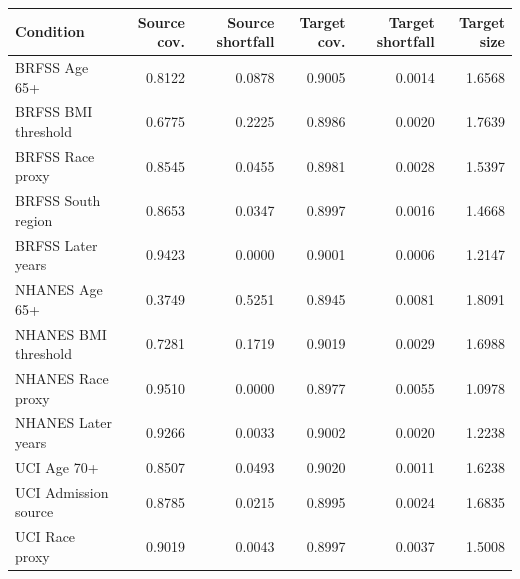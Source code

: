 \begin{tabular}{lrrrrr}
\toprule
Condition & Source cov. & Source shortfall & Target cov. & Target shortfall & Target size \\
\midrule
BRFSS Age 65+ & 0.8122 & 0.0878 & 0.9005 & 0.0014 & 1.6568 \\
BRFSS BMI threshold & 0.6775 & 0.2225 & 0.8986 & 0.0020 & 1.7639 \\
BRFSS Race proxy & 0.8545 & 0.0455 & 0.8981 & 0.0028 & 1.5397 \\
BRFSS South region & 0.8653 & 0.0347 & 0.8997 & 0.0016 & 1.4668 \\
BRFSS Later years & 0.9423 & 0.0000 & 0.9001 & 0.0006 & 1.2147 \\
NHANES Age 65+ & 0.3749 & 0.5251 & 0.8945 & 0.0081 & 1.8091 \\
NHANES BMI threshold & 0.7281 & 0.1719 & 0.9019 & 0.0029 & 1.6988 \\
NHANES Race proxy & 0.9510 & 0.0000 & 0.8977 & 0.0055 & 1.0978 \\
NHANES Later years & 0.9266 & 0.0033 & 0.9002 & 0.0020 & 1.2238 \\
UCI Age 70+ & 0.8507 & 0.0493 & 0.9020 & 0.0011 & 1.6238 \\
UCI Admission source & 0.8785 & 0.0215 & 0.8995 & 0.0024 & 1.6835 \\
UCI Race proxy & 0.9019 & 0.0043 & 0.8997 & 0.0037 & 1.5008 \\
\bottomrule
\end{tabular}
